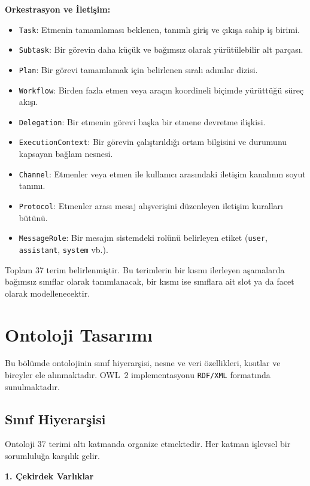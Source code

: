 \documentclass[10pt, a4paper, twocolumn]{article}
\begin{document}
\textbf{Orkestrasyon ve İletişim:}
\begin{itemize}
    \item \texttt{Task}: Etmenin tamamlaması beklenen, tanımlı giriş ve çıkışa sahip iş birimi.
    \item \texttt{Subtask}: Bir görevin daha küçük ve bağımsız olarak yürütülebilir alt parçası.
    \item \texttt{Plan}: Bir görevi tamamlamak için belirlenen sıralı adımlar dizisi.
    \item \texttt{Workflow}: Birden fazla etmen veya araçın koordineli biçimde yürüttüğü süreç akışı.
    \item \texttt{Delegation}: Bir etmenin görevi başka bir etmene devretme ilişkisi.
    \item \texttt{ExecutionContext}: Bir görevin çalıştırıldığı ortam bilgisini ve durumunu kapsayan bağlam nesnesi.
    \item \texttt{Channel}: Etmenler veya etmen ile kullanıcı arasındaki iletişim kanalının soyut tanımı.
    \item \texttt{Protocol}: Etmenler arası mesaj alışverişini düzenleyen iletişim kuralları bütünü.
    \item \texttt{MessageRole}: Bir mesajın sistemdeki rolünü belirleyen etiket (\texttt{user}, \texttt{assistant}, \texttt{system} vb.).
\end{itemize}

Toplam 37 terim belirlenmiştir. Bu terimlerin bir kısmı ilerleyen aşamalarda bağımsız sınıflar olarak tanımlanacak, bir kısmı ise sınıflara ait slot ya da facet olarak modellenecektir.

\section{Ontoloji Tasarımı}

Bu bölümde ontolojinin sınıf hiyerarşisi, nesne ve veri özellikleri, kısıtlar ve bireyler ele alınmaktadır. OWL~2 implementasyonu \texttt{RDF/XML} formatında sunulmaktadır.

\subsection{Sınıf Hiyerarşisi}

Ontoloji 37 terimi altı katmanda organize etmektedir. Her katman işlevsel bir sorumluluğa karşılık gelir.

\medskip
\noindent\textbf{1. Çekirdek Varlıklar}
\end{document}
